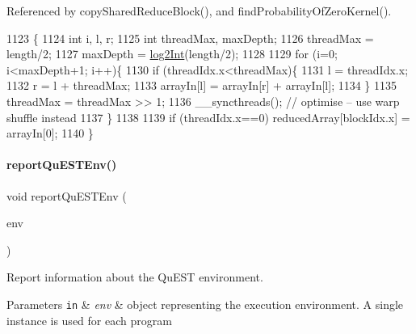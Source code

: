 Referenced by copy\+Shared\+Reduce\+Block(), and find\+Probability\+Of\+Zero\+Kernel().


\begin{DoxyCode}
1123                                                                           \{
1124     \textcolor{keywordtype}{int} i, l, r;
1125     \textcolor{keywordtype}{int} threadMax, maxDepth;
1126     threadMax = length/2;
1127     maxDepth = \mbox{\hyperlink{QuEST__env__localGPU_8cu_a8ce1e311ea72b862a8757dc71082fbf3}{log2Int}}(length/2);
1128 
1129     \textcolor{keywordflow}{for} (i=0; i<maxDepth+1; i++)\{
1130         \textcolor{keywordflow}{if} (threadIdx.x<threadMax)\{
1131             l = threadIdx.x;
1132             r = l + threadMax;
1133             arrayIn[l] = arrayIn[r] + arrayIn[l];
1134         \}
1135         threadMax = threadMax >> 1;
1136         \_\_syncthreads(); \textcolor{comment}{// optimise -- use warp shuffle instead}
1137     \}
1138 
1139     \textcolor{keywordflow}{if} (threadIdx.x==0) reducedArray[blockIdx.x] = arrayIn[0];
1140 \}
\end{DoxyCode}
\mbox{\label{QuEST__env__localGPU_8cu_af8a14ae79c3fb2c0b5f6255cc37bebf9}} 
\paragraph{\texorpdfstring{report\+Qu\+E\+S\+T\+Env()}{reportQuESTEnv()}}
{\footnotesize\ttfamily void report\+Qu\+E\+S\+T\+Env (\begin{DoxyParamCaption}\item[{\mbox{\hyperlink{structQuESTEnv}{Qu\+E\+S\+T\+Env}}}]{env }\end{DoxyParamCaption})}



Report information about the Qu\+E\+ST environment. 


\begin{DoxyParams}[1]{Parameters}
\mbox{\tt in}  & {\em env} & object representing the execution environment. A single instance is used for each program \\
\hline
\end{DoxyParams}


